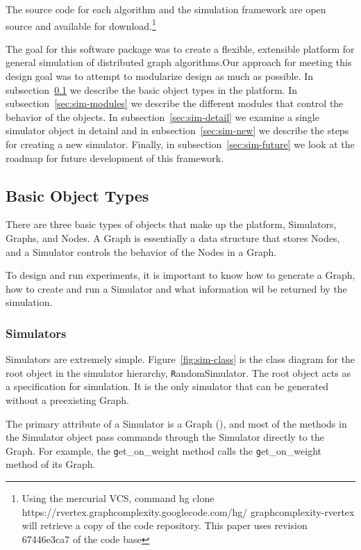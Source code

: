 The source code for each algorithm and the simulation framework are open source and available for download.\footnote{Using the mercurial VCS, command hg clone https://rvertex.graphcomplexity.googlecode.com/hg/ graphcomplexity-rvertex will retrieve a copy of the code repository. This paper uses revision 67446e3ca7 of the code base} 

The goal for this software package was to create a flexible, extensible platform for general simulation of distributed graph algorithms.Our approach for meeting this design goal was to attempt to modularize design as much as possible. In subsection~\ref{sec:sim-objects} we describe the basic object types in the platform. In subsection~\ref{sec:sim-modules} we describe the different modules that control the behavior of the objects. In subsection~\ref{sec:sim-detail} we examine a single simulator object in detainl and in subsection~\ref{sec:sim-new} we describe the steps for creating a new simulator. Finally, in subsection~\ref{sec:sim-future} we look at the roadmap for future development of this framework.

\subsection{Basic Object Types}
\label{sec:sim-objects}

There are three basic types of objects that make up the platform, Simulators, Graphs, and Nodes. A Graph is essentially a data structure that stores Nodes, and a Simulator controls the behavior of the Nodes in a Graph. 

To design and run experiments, it is important to know how to generate a Graph, how to create and run a Simulator and what information wil be returned by the simulation. 

\subsubsection{Simulators}

Simulators are extremely simple. Figure~\ref{fig:sim-class} is the class diagram for the root object in the simulator hierarchy, {\texttt RandomSimulator}. The root object acts as a specification for simulation. It is the only simulator that can be generated without a preexisting Graph. 

The primary attribute of a Simulator is a Graph ({\texttt \@rg}), and most of the methods in the Simulator object pass commands through the Simulator directly to the Graph. For example, the {\texttt get\_on\_weight} method calls the {\texttt get\_on\_weight} method of its Graph.

